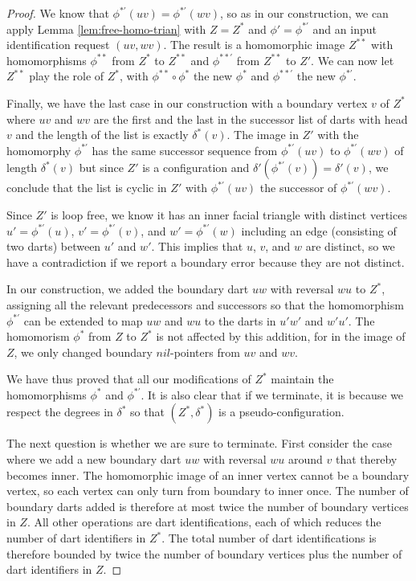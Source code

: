 \documentclass[10pt,a4paper]{amsart}
\def\nil{\textit{nil}}
\begin{document}
\begin{proof}
We know that $\phi^{*\prime}(uv)=\phi^{*\prime}(wv)$, so as in our construction, we can apply Lemma \ref{lem:free-homo-trian} with $Z=Z^*$ and $\phi'=\phi^{*\prime}$ and an input identification request $(uv,wv)$.
The result is a homomorphic image $Z^{**}$ with homomorphisms $\phi^{**}$ from $Z^*$ to $Z^{**}$ and $\phi^{**'}$ from
$Z^{**}$ to $Z'$. We can now let
$Z^{**}$ play the role of $Z^*$,
with $\phi^{**}\circ \phi^*$ the new $\phi^*$ and $\phi^{**\prime}$ the new $\phi^{*\prime}$.

Finally, we have the last case in our construction with a boundary vertex  $v$ of $Z^*$
where $uv$ and $wv$ are the first and the last in the successor list of darts with head $v$ and the length of the list is exactly $\delta^*(v)$. The image in $Z'$ with the homomorphy $\phi^{*\prime}$ has the same successor sequence
from $\phi^{*\prime}(uv)$ to $\phi^{*\prime}(wv)$ of length $\delta^*(v)$ but since $Z'$ is a configuration and $\delta'(\phi^{*\prime}(v))=\delta'(v)$, we conclude that the list is cyclic in $Z'$ with $\phi^{*\prime}(uv)$ the successor of $\phi^{*\prime}(wv)$.

Since $Z'$ is loop free, we know it has an inner
facial triangle with 
distinct vertices $u'=\phi^{*\prime}(u)$, $v'=\phi^{*\prime}(v)$, and $w'=\phi^{*\prime}(w)$ including an
edge (consisting of two darts) between $u'$ and $w'$. 
This implies that $u$, $v$, and $w$ are distinct,
so we have a contradiction if we report a boundary error because they are not distinct.

In our construction, we  added the boundary dart  $uw$ with reversal $wu$ to $Z^*$, assigning all the relevant predecessors and successors so that the homomorphism $\phi^{*\prime}$ can be extended to map $uw$ and
$wu$ to the darts in $u'w'$ and $w'u'$. The homomorism $\phi^*$ from
$Z$ to $Z^*$ is not affected by this addition,
for in the image of $Z$,
we only changed boundary  $\nil$-pointers from $uv$
and $wv$.

We have thus proved that all our modifications
of $Z^*$ maintain the homomorphisms $\phi^*$ and $\phi^{*\prime}$. It is also clear that if we terminate, it is because we respect the degrees in $\delta^*$ so that
$(Z^*,\delta^*)$ is a pseudo-configuration.


The next question is whether we are sure to terminate. First consider the case where we add a new boundary dart $uw$ with reversal $wu$ around $v$ that thereby becomes inner.
The homomorphic image of an inner vertex cannot be a boundary vertex, so each vertex can only turn from boundary to inner once. The number of boundary darts added is therefore at most twice the number of boundary vertices in $Z$.  All other operations are dart identifications, each of which reduces the number of dart identifiers in $Z^*$. The total number of dart identifications 
is therefore bounded by  twice the number of boundary vertices plus 
the number of dart identifiers in $Z$.


\end{proof}
\end{document}
